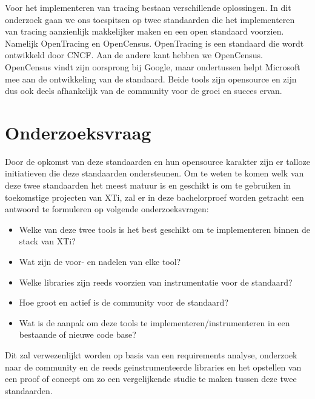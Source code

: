 Voor het implementeren van tracing bestaan verschillende oplossingen. In dit onderzoek gaan we ons toespitsen op twee standaarden die het implementeren van tracing aanzienlijk makkelijker maken en een open standaard voorzien. Namelijk OpenTracing en OpenCensus. OpenTracing is een standaard die wordt ontwikkeld door \gls{CNCF}. Aan de andere kant hebben we OpenCensus. OpenCensus vindt zijn oorsprong bij Google, maar ondertussen helpt Microsoft mee aan de ontwikkeling van de standaard. Beide tools zijn opensource en zijn dus ook deels afhankelijk van de community voor de groei en succes ervan.

\section{Onderzoeksvraag}
\label{sec:onderzoeksvraag}
Door de opkomst van deze standaarden en hun opensource karakter zijn er talloze initiatieven die deze standaarden ondersteunen. Om te weten te komen welk van deze twee standaarden het meest matuur is en geschikt is om te gebruiken in toekomstige projecten van XTi, zal er in deze bachelorproef worden getracht een antwoord te formuleren op volgende onderzoeksvragen:

\begin{itemize}
	\item Welke van deze twee tools is het best geschikt om te implementeren binnen de stack van XTi?
	\item Wat zijn de voor- en nadelen van elke tool?
	\item Welke libraries zijn reeds voorzien van instrumentatie voor de standaard?
	\item Hoe groot en actief is de community voor de standaard?
	\item Wat is de aanpak om deze tools te implementeren/instrumenteren in een bestaande of nieuwe code base?
\end{itemize}

Dit zal verwezenlijkt worden op basis van een requirements analyse, onderzoek naar de community en de reeds geinstrumenteerde libraries en het opstellen van een proof of concept om zo een vergelijkende studie te maken tussen deze twee standaarden.

